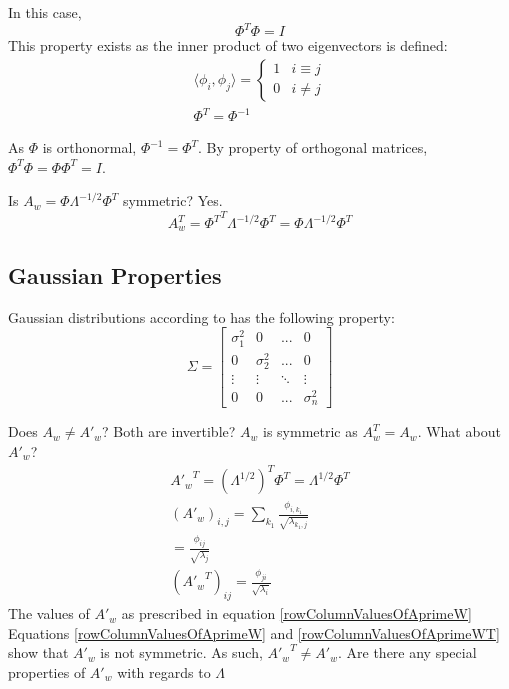\documentclass[11pt]{article}
\begin{document}
In this case, 
\begin{equation}
\Phi^T \Phi = I
\end{equation}
This property exists as the inner product of two eigenvectors is defined:
\begin{eqnarray}
\langle \phi_i , \phi_j \rangle = 
\left\{
\begin{array}{ll}
	1 & i \equiv j \\
	0 & i \neq j
\end{array}
\right. \label{orthogonalEigenvectors} \\
\Phi ^T = \Phi^{-1}  \label{orthonormalEigenvectors}
\end{eqnarray}

As $\Phi$ is orthonormal, $\Phi^{-1} = \Phi^T$.  By property of orthogonal matrices, $\Phi^T \Phi = \Phi \Phi^T = I$.  

Is $A_w = \Phi \Lambda^{-1/2} \Phi^T$ symmetric?   Yes.   
\begin{equation}
	A_w ^T = {\Phi^T}^T \Lambda^{-1/2} \Phi^T = \Phi \Lambda^{-1/2} \Phi^T
\end{equation}



\subsection{Gaussian Properties}

Gaussian distributions according to \cite[625]{duda-hart-stork} has the following property:
\begin{equation}
	\Sigma = \left[
	\begin{array}{cccc}
	\sigma_1^2 & 0 & ... & 0 \\
	0	& \sigma_2^2 & ... & 0 \\
	\vdots & \vdots & \ddots & \vdots \\
	0 & 0 & ... & \sigma_n^2 
	\end{array}
	\right]
\end{equation}

Does $A_w \neq A'_w$?  Both are invertible?  $A_w$ is symmetric as $A_w^T = A_w$.   What about $A'_w$?
\begin{eqnarray}
	{A'_w} ^T = (\Lambda ^{1/2})^T \Phi^T = \Lambda^{1/2} \Phi ^T \label{AprimeW} \\
	(A'_w)_{i,j} = \sum_{k_1}  \frac{\phi_{i,k_1}}{\sqrt{\lambda_{k_1, j}}} \\
	=  \frac{\phi_{ij}}{\sqrt{\lambda_{j}}} \label{rowColumnValuesOfAprimeW}\\
	({A'_w} ^T )_{ij} = \frac{\phi_{ji}}{\sqrt{\lambda_i}} \label{rowColumnValuesOfAprimeWT}
\end{eqnarray}
The values of $A'_w$ as prescribed in equation \ref{rowColumnValuesOfAprimeW}
Equations \ref{rowColumnValuesOfAprimeW} and \ref{rowColumnValuesOfAprimeWT} show that $A'_w$ is not symmetric.   As such, ${A'_w}^T \neq A'_w$.  Are there any special properties of $A'_w$ with regards to $\Lambda$
\end{document}
